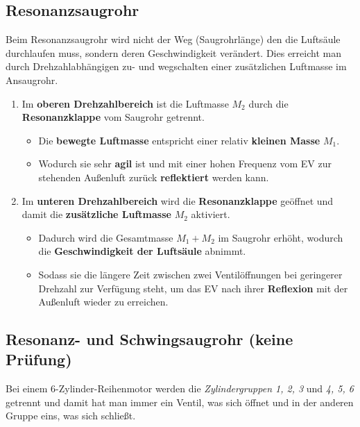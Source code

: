 \subsection{Resonanzsaugrohr}\label{resonanzsaugrohr}

Beim Resonanzsaugrohr wird nicht der Weg (Saugrohrlänge) den die
Luftsäule durchlaufen muss, sondern deren Geschwindigkeit verändert.
Dies erreicht man durch Drehzahlabhängigen zu- und wegschalten einer
zusätzlichen Luftmasse im Ansaugrohr.

\begin{enumerate}
\item
  Im \textbf{oberen Drehzahlbereich} ist die Luftmasse $M_2$ durch die
  \textbf{Resonanzklappe} vom Saugrohr getrennt.

  \begin{itemize}
  \item
    Die \textbf{bewegte Luftmasse} entspricht einer relativ
    \textbf{kleinen Masse} $M_1$.
  \item
    Wodurch sie sehr \textbf{agil} ist und mit einer hohen Frequenz vom
    EV zur stehenden Außenluft zurück \textbf{reflektiert} werden kann.
  \end{itemize}
\item
  Im \textbf{unteren Drehzahlbereich} wird die \textbf{Resonanzklappe}
  geöffnet und damit die \textbf{zusätzliche Luftmasse} $M_2$
  aktiviert.

  \begin{itemize}
  \item
    Dadurch wird die Gesamtmasse $M_1 + M_2$ im Saugrohr erhöht,
    wodurch die \textbf{Geschwindigkeit der Luftsäule} abnimmt.
  \item
    Sodass sie die längere Zeit zwischen zwei Ventilöffnungen bei
    geringerer Drehzahl zur Verfügung steht, um das EV nach ihrer
    \textbf{Reflexion} mit der Außenluft wieder zu erreichen.
  \end{itemize}
\end{enumerate}

\subsection{Resonanz- und Schwingsaugrohr (keine
Prüfung)}\label{resonanz--und-schwingsaugrohr-keine-pruefung}

Bei einem 6-Zylinder-Reihenmotor werden die \emph{Zylindergruppen 1, 2,
3} und \emph{4, 5, 6} getrennt und damit hat man immer ein Ventil, was
sich öffnet und in der anderen Gruppe eins, was sich schließt.

